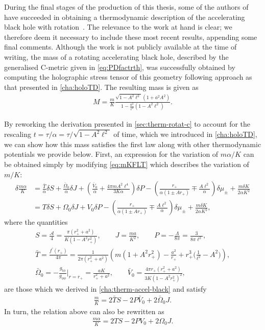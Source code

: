 \documentclass[
twoside,
openright,
frontopenright,
]{dmathesis}
\newcommand{\nn}{\nonumber}
\begin{document}
During the final stages of the production of this thesis, some of the authors
of~\cite{Anabalon:2018ydc} have succeeded in obtaining a thermodynamic
description of the accelerating black hole with
rotation~\cite{Anabalon:2018aa}. The relevance to the work at hand is clear; we
therefore deem it necessary to include these most recent results, appending some
final comments. Although the work is not publicly available at the time of
writing, the mass of a rotating accelerating black hole, described by the
generalised C-metric given in \cref{eq:PDfactrth}, was successfully obtained by
computing the holographic stress tensor of this geometry following approach as
that presented in \cref{cha:holoTD}. The resulting mass is given as
\begin{align}
  \label{eq:rotMass}
  M = \frac{m}{K} \frac{\sqrt{1-A^2\ell^2} (1+a^2A^2)}{1 - \frac{a^2}{\ell^2}
  (1-A^2\ell^2)}.
\end{align}

By reworking the derivation presented in \cref{sec:therm-rotat-c} to account for
the rescaling $t=\tau/\alpha = \tau/\sqrt{1-A^2\ell^2}$ of time, which we
introduced in \cref{cha:holoTD}, we can show how this mass satisfies the first
law along with other thermodynamic potentials we provide below. First, an
expression for the variation of $m\alpha/K$ can be obtained simply by modifying
\cref{eq:mKFLT} which describes the variation of $m/K$:
\begin{align}
  \label{eq:dmak}
  \delta \frac{m\alpha}{K} &= \frac{\bar{T}}{\alpha}\delta S +
  \frac{\bar{\Omega}_0}{\alpha} \delta J + \left(\frac{\bar{V}_0}{\alpha} +
  \frac{4\pi mA^2\ell^4}{3K\alpha}\right)
  \delta P - \left(\frac{r_+}{\alpha(1\pm Ar_+)} \mp
  \frac{A\ell^2}{\alpha}\right) \delta \mu_\pm +\frac{m\delta K}{2\alpha
                             K^2}\nn\\
  &= T\delta S +
  \Omega_0 \delta J + V_0 \delta P - \left(\frac{r_+}{\alpha(1\pm Ar_+)} \mp
  \frac{A\ell^2}{\alpha}\right) \delta \mu_\pm +\frac{m\delta K}{2\alpha
                             K^2},
\end{align} 
where the quantities
\begin{gather}
  S = \frac{\mathcal{A}}{4} = \frac{\pi(r_+^2+a^2)}{K(1-A^2 r_+^2)}, \qquad  J =
  \frac{m a}{K^2}, \qquad P =
  -\frac{\Lambda}{8\pi} = \frac{3}{8\pi \ell^2},\nn\\  
  \bar{T}= \frac{f^\prime (r_+)}{4\pi} = \frac{1}{2\pi(r_+^2+a^2)}\left(m(1+A^2r_+^2)
    - \frac{a^2}{r_+}+r_+^3\Big(\frac{1}{\ell^2}-A^2\Big)\right),\nn\\
  \bar{\Omega}_0 = -\frac{g_{t\phi}}{g_{\phi\phi}}\bigg|_{r=r_+} = \frac{a
    K}{r_+^2+a^2}, \qquad
  \bar{V}_0 = \frac{4\pi r_+ (r_+^2+a^2)}{3 K (1-A^2 r_+^2)^2},
\end{gather}
are those which we derived in \cref{cha:therm-accel-black} and satisfy
\begin{align}
  \frac{m}{K} = 2\bar{T}S - 2P\bar{V}_0 + 2\bar{\Omega}_0J.
\end{align}
In turn, the relation above can also be rewritten as
\begin{align}
  \frac{m\alpha}{K} = 2TS-2PV_0+2\Omega_0J.
\end{align}
\end{document}
